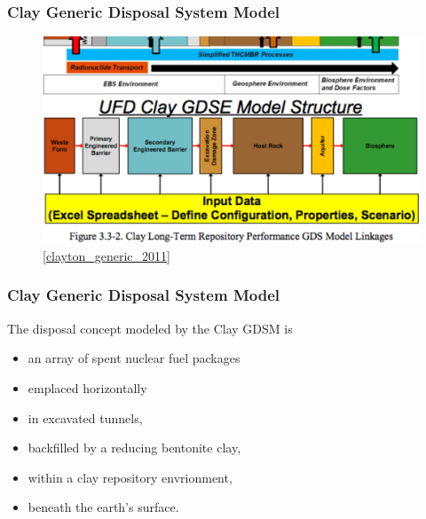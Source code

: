 \begin{frame}[c]
  \frametitle{Clay Generic Disposal System Model}
\begin{figure}[htb!]
\begin{center}
\includegraphics[height=0.7\textheight]{feps.eps}
\end{center}
\caption{\ref{clayton_generic_2011}}
\label{fig:feps}
\end{figure}
\end{frame}

\begin{frame}[c]
  \frametitle{Clay Generic Disposal System Model}
The disposal concept modeled by the Clay \gls{GDSM} \cite{nutt_generic_2009} is
\begin{itemize}
  \item an array of spent nuclear fuel packages 
  \item emplaced horizontally
  \item in excavated tunnels, 
  \item backfilled by a reducing bentonite clay,
  \item within a clay repository envrionment, 
  \item {} beneath the earth's surface.
\end{itemize}
\end{frame}

